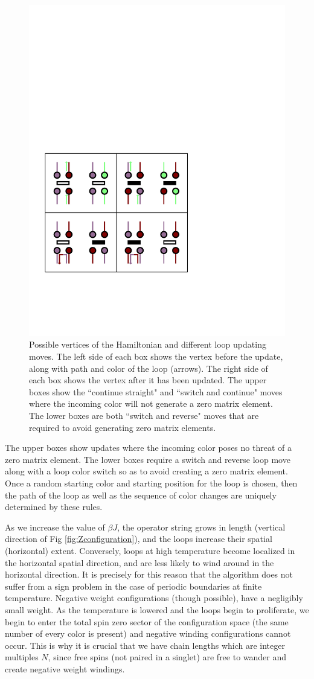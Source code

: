 \documentclass[aps,prb,reprint,floatfix]{revtex4-1}
\begin{document}
\begin{figure}
\centerline{\includegraphics[angle=0,width=.7\columnwidth]{vertices.pdf}}
\caption{Possible vertices of the Hamiltonian and different loop updating moves.  The left side of each box shows the vertex before the update, along with path and color of the loop (arrows).  The right side of each box shows the vertex after it has been updated.  The upper boxes show the ``continue straight"  and ``switch and continue" moves where the incoming color will not generate a zero matrix element.  The lower boxes are both ``switch and reverse" moves that are required to avoid generating zero matrix elements.}
\label{fig:vertices}
\end{figure}
The upper boxes show updates where the incoming color poses no threat of a zero matrix element.  The lower boxes require a switch and reverse loop move along with a loop color switch so as to avoid creating a zero matrix element.  Once a random starting color and starting position for the loop is chosen, then the path of the loop as well as the sequence of color changes are uniquely determined by these rules.

As we increase the value of $\beta J$, the operator string grows in length (vertical direction of Fig \ref{fig:Zconfiguration}), and the loops increase their spatial (horizontal) extent.  Conversely, loops at high temperature become localized in the horizontal spatial direction, and are less likely to wind around in the horizontal direction.  It is precisely for this reason that the algorithm does not suffer from a sign problem in the case of periodic boundaries at finite temperature.  Negative weight configurations (though possible), have a negligibly small weight.  As the temperature is lowered and the loops begin to proliferate, we begin to enter the total spin zero sector of the configuration space (the same number of every color is present) and negative winding configurations cannot occur.  This is why it is crucial that we have chain lengths which are integer multiples $N$, since free spins (not paired in a singlet) are free to wander and create negative weight windings.
\end{document}
